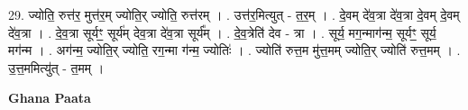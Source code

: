 \documentclass[17pt]{extarticle}
\begin{document}
29. ज्योति॒ रुत्त॑र॒ मुत्त॑र॒म् ज्योति॒र् ज्योति॒ रुत्त॑रम् । . उत्त॑र॒मित्युत् - त॒र॒म् । . दे॒वम् दे॑व॒त्रा दे॑व॒त्रा दे॒वम् दे॒वम् दे॑व॒त्रा । . दे॒व॒त्रा सूर्यꣳ॒॒ सूर्य॑म् देव॒त्रा दे॑व॒त्रा सूर्य᳚म् । . दे॒व॒त्रेति॑ देव - त्रा । . सूर्य॒ मग॒न्माग॑न्म॒ सूर्यꣳ॒॒ सूर्य॒ मग॑न्म । . अग॑न्म॒ ज्योति॒र् ज्योति॒ रग॒न्मा ग॑न्म॒ ज्योतिः॑ । . ज्योति॑ रुत्त॒म मु॑त्त॒मम् ज्योति॒र् ज्योति॑ रुत्त॒मम् । . उ॒त्त॒ममित्यु॑त् - त॒मम् । \newline

\textbf{Ghana Paata } \newline
\end{document}
